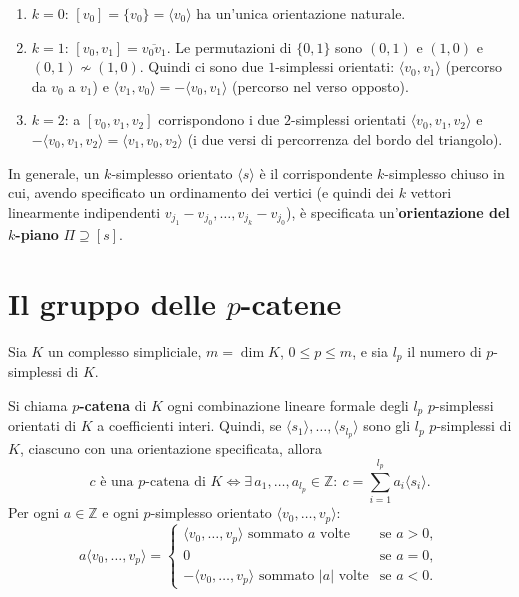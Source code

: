 \begin{ejemplo}
\begin{enumerate}
    \item $k = 0$: $[v_0] = \{v_0\} = \langle v_0 \rangle$ ha un'unica orientazione naturale.
    \item $k = 1$: $[v_0, v_1] = \overline{v_0 v_1}$. Le permutazioni di $\{0,1\}$ sono $(0,1)$ e $(1,0)$ e $(0,1) \not\sim (1,0)$. Quindi ci sono due $1$-simplessi orientati: $\langle v_0, v_1 \rangle$ (percorso da $v_0$ a $v_1$) e $\langle v_1, v_0 \rangle = -\langle v_0, v_1 \rangle$ (percorso nel verso opposto).
    \item $k = 2$: a $[v_0, v_1, v_2]$ corrispondono i due $2$-simplessi orientati $\langle v_0, v_1, v_2 \rangle$ e $-\langle v_0, v_1, v_2 \rangle = \langle v_1, v_0, v_2 \rangle$ (i due versi di percorrenza del bordo del triangolo).
\end{enumerate}
In generale, un $k$-simplesso orientato $\langle s \rangle$ \`e il corrispondente $k$-simplesso chiuso in cui, avendo specificato un ordinamento dei vertici (e quindi dei $k$ vettori linearmente indipendenti $v_{j_1} - v_{j_0}, \dots, v_{j_k} - v_{j_0}$), \`e specificata un'\textbf{orientazione del $k$-piano} $\Pi \supseteq [s]$.
\end{ejemplo}

\section{Il gruppo delle $p$-catene}

Sia $K$ un complesso simpliciale, $m = \dim K$, $0 \leqslant p \leqslant m$, e sia $l_p$ il numero di $p$-simplessi di $K$.

\begin{definicion}[$p$-catene]
Si chiama \textbf{$p$-catena} di $K$ ogni combinazione lineare formale degli $l_p$ $p$-simplessi orientati di $K$ a coefficienti interi. Quindi, se $\langle s_1 \rangle, \dots, \langle s_{l_p} \rangle$ sono gli $l_p$ $p$-simplessi di $K$, ciascuno con una orientazione specificata, allora
\[
c \text{ \`e una $p$-catena di } K \iff \exists\, a_1, \dots, a_{l_p} \in \mathbb{Z} : \ c = \sum_{i=1}^{l_p} a_i \langle s_i \rangle .
\]
Per ogni $a \in \mathbb{Z}$ e ogni $p$-simplesso orientato $\langle v_0, \dots, v_p \rangle$:
\[
a \langle v_0, \dots, v_p \rangle = \begin{cases} \langle v_0, \dots, v_p \rangle \text{ sommato } a \text{ volte} & \text{se } a > 0, \\ 0 & \text{se } a = 0, \\ -\langle v_0, \dots, v_p \rangle \text{ sommato } |a| \text{ volte} & \text{se } a < 0. \end{cases}
\]
\end{definicion}

